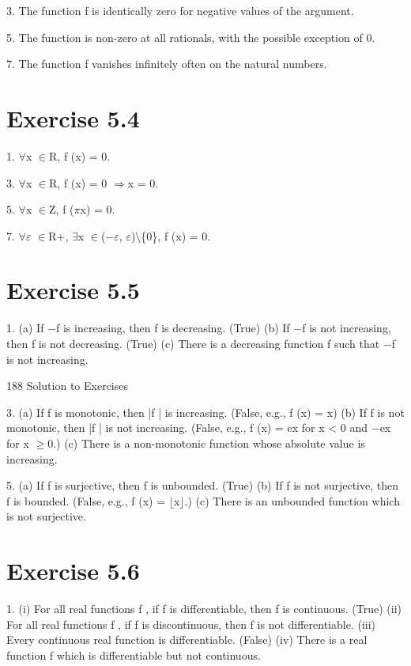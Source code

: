 \documentclass[11pt]{article}
\theoremstyle{plain}
\theoremstyle{definition}
\begin{document}
3. The function f is identically zero for negative values of the argument.

5. The function is non-zero at all rationals, with the possible exception of 0.

7. The function f vanishes infinitely often on the natural numbers.

\section{Exercise 5.4}

1. $\forall$x $\in$R, f (x) = 0.

3. $\forall$x $\in$R, f (x) = 0 $\Rightarrow$x = 0.

5. $\forall$x $\in$Z, f ($\pi$x) = 0.

7. $\forall$$\varepsilon$ $\in$R+, $\exists$x $\in$($-$$\varepsilon$, $\varepsilon$)$\setminus$\{0\}, f (x) = 0.

\section{Exercise 5.5}

1. (a) If $-$f is increasing, then f is decreasing. (True) (b) If $-$f is not increasing, then f is not decreasing. (True) (c) There is a decreasing function f such that $-$f is not increasing.

188 Solution to Exercises

3. (a) If f is monotonic, then |f | is increasing. (False, e.g., f (x) = x) (b) If f is not monotonic, then |f | is not increasing. (False, e.g., f (x) = ex for x < 0 and $-$ex for x $\geq$0.) (c) There is a non-monotonic function whose absolute value is increasing.

5. (a) If f is surjective, then f is unbounded. (True) (b) If f is not surjective, then f is bounded. (False, e.g., f (x) = $\lfloor$x$\rfloor$.) (c) There is an unbounded function which is not surjective.

\section{Exercise 5.6}

1. (i) For all real functions f , if f is differentiable, then f is continuous. (True) (ii) For all real functions f , if f is discontinuous, then f is not differentiable. (iii) Every continuous real function is differentiable. (False) (iv) There is a real function f which is differentiable but not continuous.
\end{document}
